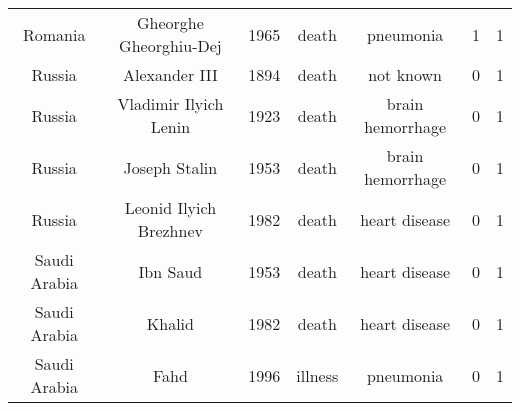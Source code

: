 \begin{center}
\begin{longtable}{ccccccc}
Romania                                                                    & Gheorghe Gheorghiu-Dej                                                                & 1965       & death         & pneumonia                                                              & 1        & 1       \\
Russia                                                                     & Alexander III                                                                         & 1894       & death         & not known                                                              & 0        & 1       \\
Russia                                                                     & Vladimir Ilyich Lenin                                                                 & 1923       & death         & brain hemorrhage                                                       & 0        & 1       \\
Russia                                                                     & Joseph Stalin                                                                         & 1953       & death         & brain hemorrhage                                                       & 0        & 1       \\
Russia                                                                     & Leonid Ilyich Brezhnev                                                                & 1982       & death         & heart disease                                                          & 0        & 1       \\
Saudi Arabia                                                               & Ibn Saud                                                                              & 1953       & death         & heart disease                                                          & 0        & 1       \\
Saudi Arabia                                                               & Khalid                                                                                & 1982       & death         & heart disease                                                          & 0        & 1       \\
Saudi Arabia                                                               & Fahd                                                                                  & 1996       & illness       & pneumonia                                                              & 0        & 1       \\

\end{longtable}
\end{center}
